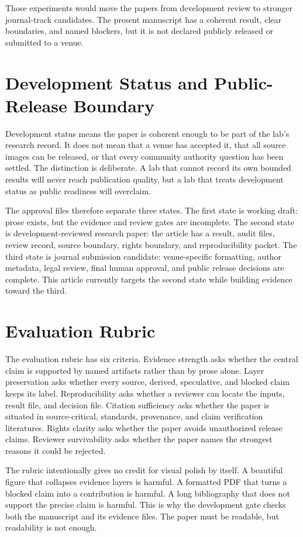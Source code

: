 \documentclass[sigconf,nonacm]{acmart}
\begin{document}
Those experiments would move the papers from development review to stronger
journal-track candidates. The present manuscript has a coherent result, clear
boundaries, and named blockers, but it is not declared publicly released or
submitted to a venue.

\section{Development Status and Public-Release Boundary}
Development status means the paper is coherent enough to be part of the lab's
research record. It does not mean that a venue has accepted it, that all source
images can be released, or that every community authority question has been
settled. The distinction is deliberate. A lab that cannot record its own bounded
results will never reach publication quality, but a lab that treats development
status as public readiness will overclaim.

The approval files therefore separate three states. The first state is working
draft: prose exists, but the evidence and review gates are incomplete. The
second state is development-reviewed research paper: the article has a result,
audit files, review record, source boundary, rights boundary, and reproducibility
packet. The third state is journal submission candidate: venue-specific
formatting, author metadata, legal review, final human approval, and public
release decisions are complete. This article currently targets the second state
while building evidence toward the third.

\section{Evaluation Rubric}
The evaluation rubric has six criteria. Evidence strength asks whether the
central claim is supported by named artifacts rather than by prose alone.
Layer preservation asks whether every source, derived, speculative, and blocked
claim keeps its label. Reproducibility asks whether a reviewer can locate the
inputs, result file, and decision file. Citation sufficiency asks whether the
paper is situated in source-critical, standards, provenance, and claim
verification literatures. Rights clarity asks whether the paper avoids
unauthorized release claims. Reviewer survivability asks whether the paper names
the strongest reasons it could be rejected.

The rubric intentionally gives no credit for visual polish by itself. A
beautiful figure that collapses evidence layers is harmful. A formatted PDF that
turns a blocked claim into a contribution is harmful. A long bibliography that
does not support the precise claim is harmful. This is why the development gate
checks both the manuscript and its evidence files. The paper must be readable,
but readability is not enough.
\end{document}
